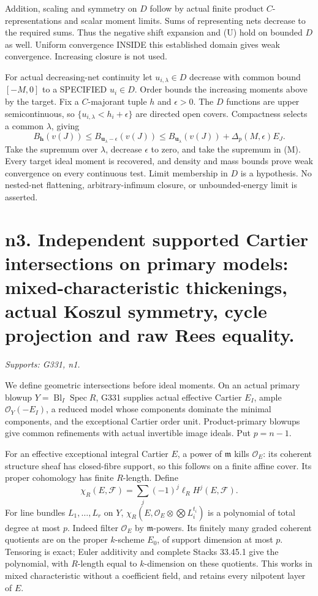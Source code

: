 \documentclass[11pt]{article}
\begin{document}
Addition, scaling and symmetry on \(D\) follow by actual finite product \(C\)-representations and scalar moment limits. Sums of representing nets decrease to the required sums. Thus the negative shift expansion and (U) hold on bounded \(D\) as well. Uniform convergence INSIDE this established domain gives weak convergence. Increasing closure is not used.

For actual decreasing-net continuity let \(u_{i,\lambda}\in D\) decrease with common bound \([-M,0]\) to a SPECIFIED \(u_i\in D\). Order bounds the increasing moments above by the target. Fix a \(C\)-majorant tuple \(h\) and \(\epsilon>0\). The \(D\) functions are upper semicontinuous, so \(\{u_{i,\lambda}<h_i+\epsilon\}\) are directed open covers. Compactness selects a common \(\lambda\), giving
\[
B_{\boldsymbol h}(v(J))\le B_{\boldsymbol u_\lambda-\epsilon}(v(J))
\le B_{\boldsymbol u_\lambda}(v(J))+\Delta_p(M,\epsilon)E_J.
\]
Take the supremum over \(\lambda\), decrease \(\epsilon\) to zero, and take the supremum in (M). Every target ideal moment is recovered, and density and mass bounds prove weak convergence on every continuous test. Limit membership in \(D\) is a hypothesis. No nested-net flattening, arbitrary-infimum closure, or unbounded-energy limit is asserted.

\section{n3. Independent supported Cartier intersections on primary models: mixed-characteristic thickenings, actual Koszul symmetry, cycle projection and raw Rees equality.}
\textit{Supports: G331, n1.}

We define geometric intersections before ideal moments. On an actual primary blowup \(Y=\operatorname{Bl}_I\operatorname{Spec}R\), G331 supplies actual effective Cartier \(E_I\), ample \(\mathcal O_Y(-E_I)\), a reduced model whose components dominate the minimal components, and the exceptional Cartier order unit. Product-primary blowups give common refinements with actual invertible image ideals. Put \(p=n-1\).

For an effective exceptional integral Cartier \(E\), a power of \(\mathfrak m\) kills \(\mathcal O_E\): its coherent structure sheaf has closed-fibre support, so this follows on a finite affine cover. Its proper cohomology has finite \(R\)-length. Define
\[
\chi_R(E,\mathcal F)=\sum_j(-1)^j\ell_R H^j(E,\mathcal F).
\]
For line bundles \(L_1,\ldots,L_r\) on \(Y\), \(\chi_R(E,\mathcal O_E\otimes\bigotimes L_i^{t_i})\) is a polynomial of total degree at most \(p\). Indeed filter \(\mathcal O_E\) by \(\mathfrak m\)-powers. Its finitely many graded coherent quotients are on the proper \(k\)-scheme \(E_0\), of support dimension at most \(p\). Tensoring is exact; Euler additivity and complete Stacks 33.45.1 give the polynomial, with \(R\)-length equal to \(k\)-dimension on these quotients. This works in mixed characteristic without a coefficient field, and retains every nilpotent layer of \(E\).
\end{document}
